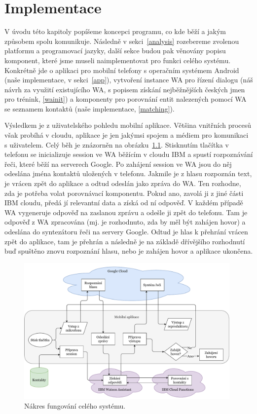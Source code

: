 \chapter{Implementace}\label{chapter-implementation}

V úvodu této kapitoly popíšeme koncepci programu, co kde
běží a jakým způsobem spolu komunikuje. Následně v sekci~\ref{analysis}
rozebereme zvolenou platformu a programovací jazyky,
další sekce budou pak věnovány popisu komponent, které jsme museli
naimplementovat pro funkci celého systému. Konkrétně jde o aplikaci pro
mobilní telefony s operačním systémem Android (naše implementace,
v sekci~\ref{app}), vytvoření instance WA pro řízení
dialogu (náš návrh za využití existujícího WA,
s popisem získání nejběžnějších českých jmen pro trénink, \ref{wainit}) a komponenty
pro porovnání entit nalezených pomocí WA se seznamem kontaktů (naše implementace,
\ref{matching}).

Výsledkem je z uživatelského pohledu mobilní
aplikace. Většina vnitřních procesů však probíhá v cloudu, aplikace
je jen jakýmsi spojem a médiem pro komunikaci s uživatelem. Celý běh
je znázorněn na obrázku~\ref{img-flowchart}. Stisknutím tlačítka v
telefonu se
inicializuje session ve WA běžícím v cloudu IBM a spustí rozpoznávání řeči,
které běží na serverech Google. Po zahájení session ve WA jsou do něj
odeslána jména kontaktů uložených v telefonu. Jakmile je z hlasu rozpoznán
text, je vrácen zpět do aplikace a odtud odeslán jako zpráva do WA.
Ten rozhodne, zda je potřeba volat
porovnávací komponentu. Pokud ano, zavolá ji z jiné části IBM cloudu,
předá jí relevantní data a získá od ní odpověď. V každém případě
WA vygeneruje odpověď na zaslanou zprávu a odešle ji zpět do telefonu.
Tam je odpověď z WA zpracována (mj. je rozhodnuto, zda by měl být
zahájen hovor) a odeslána do syntezátoru řeči na servery Google.
Odtud je hlas k přehrání vrácen zpět do aplikace, tam je přehrán
a následně je na základě dřívějšího rozhodnutí buď spuštěno znovu
rozpoznání hlasu, nebo je zahájen hovor a aplikace ukončena.


\begin{figure}[h]
    \centering
    \includegraphics[width=0.98\textwidth]{../img/app-flowchart.pdf}
    \caption{Nákres fungování celého systému.}
    \label{img-flowchart}
\end{figure}

